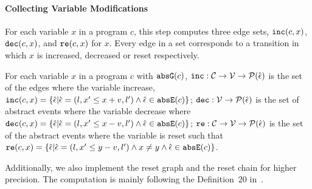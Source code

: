 \paragraph{Collecting Variable Modifications}
  For each variable $x$ in a program $c$, this step computes three edge sets, $\mathtt{inc}(c, x)$, $\mathtt{dec}(c, x)$,
  and $\mathtt{re}(c, x)$ for $x$.
  Every edge in a set corresponds to a transition in which $x$ is increased,
  decreased
  or reset
  respectively.
  \begin{defn}
    \label{def:var_modi}
    For each variable $x$ in a program $c$ with $\mathtt{abs}{\mathtt{G}}(c)$,
    $\mathtt{inc}: \mathcal{C} \to \mathcal{V} \to \mathcal{P}(\hat{\mathtt{\epsilon}{}}) $
    is the set of the edges where the variable increase, $\inc(c, x) = \left\{ \absevent | \absevent = (l, x' \leq x + v, l') \land \absevent \in \absE(c) \right\}$;
    $\mathtt{dec}: \mathcal{V} \to \mathcal{P}(\hat{\mathtt{\epsilon}{}}) $
    is the set of abstract events where the variable decrease where
    $\dec(c, x) = \left\{\absevent| \absevent = (l,  x' \leq x - v, l') \land \absevent \in \absE(c) \right\}$;
    $\mathtt{re}: \mathcal{C} \to \mathcal{V} \to \mathcal{P}(\hat{\mathtt{\epsilon}{}}) $ is the set of the abstract events where the variable is reset such that
    $\reset(c, x) = \left\{ \absevent| \absevent = (l,  x' \leq y - v, l') \land x \neq y \land \absevent \in \absE(c) \right\}$.  
  \end{defn}
  Additionally,
  we also implement the reset graph and the reset chain for higher precision. The computation is mainly following the Definition~20 in~\cite{SinnZV17}.
